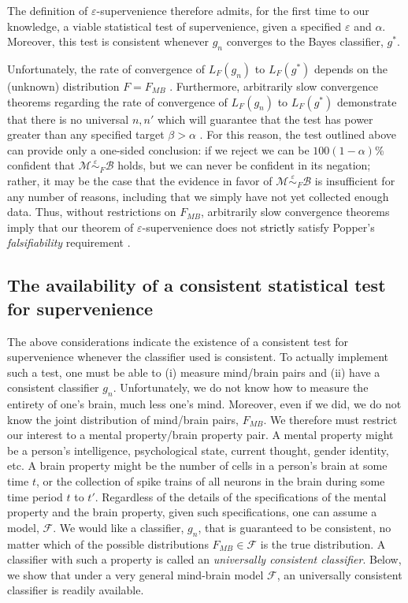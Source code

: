 \documentclass{article}
\newcommand{\conv}{\rightarrow}
\newcommand{\mB}{\mathcal{B}}
\newcommand{\mM}{\mathcal{M}}
\newcommand{\eps}{\varepsilon}
\providecommand{\mc}[1]{\mathcal{#1}}
\newcommand{\hL}{\widehat{L}}
\newcommand{\MeB}{\mM \overset{\varepsilon}{{\sim}}_{F} \mB}
\providecommand{\tr}[1]{\textcolor{black}{#1}}
\begin{document}
The definition of $\eps$-supervenience therefore admits, for the first time to our knowledge, a viable statistical test of supervenience, given a specified $\eps$ and $\alpha$. Moreover, this test is consistent whenever $g_n$ converges to the Bayes classifier, $g^*$.


Unfortunately, the rate of convergence of $L_{F}(g_n)$ to $L_{F}(g^*)$ depends on the (unknown) distribution $F=F_{MB}$ \cite{DGL96}. Furthermore, arbitrarily slow convergence theorems regarding the rate of convergence of $L_{F}(g_n)$ to $L_{F}(g^*)$ demonstrate that there is no universal $n,n'$ which will guarantee that the test has power greater than any specified target $\beta > \alpha$ \cite{Devroye83}. For this reason, the test outlined above can provide only a one-sided conclusion: if we reject we can be $100(1-\alpha)$\% confident that $\MeB$ holds, but we can never be confident in its negation; rather, it may be the case that the evidence in favor of $\MeB$ is insufficient for any number of reasons, including that we simply have not yet collected enough data. Thus, without restrictions on $F_{MB}$, arbitrarily slow convergence theorems imply that our theorem of $\varepsilon$-supervenience does not \tr{strictly} satisfy Popper's {\it falsifiability} requirement \cite{Popper}.



\subsection*{The availability of a consistent statistical test for supervenience} %
\label{sub:uc}

The above considerations indicate the existence of a consistent test for supervenience whenever the classifier used is consistent.  
To actually implement such a test, one must be able to (i) measure mind/brain pairs and (ii) have a consistent classifier $g_n$.  Unfortunately, we do not know how to measure the entirety of one's brain, much less one's mind. Moreover, even if we did, we do not know the joint distribution of mind/brain pairs, $F_{MB}$.  We therefore must restrict our interest to a mental property/brain property pair.  
A mental property might be a person's intelligence, psychological state, current thought, gender identity, etc.  A brain property might be the number of cells in a person's brain at some time $t$, or the collection of spike trains of all neurons in the brain during some time period $t$ to $t'$.  Regardless of the details of the specifications of the mental property and the brain property, given such specifications, one can assume a model, $\mc{F}$.  We would like a classifier, $g_n$, that is guaranteed to be consistent, no matter which of the possible distributions $F_{MB} \in \mc{F}$ is the true distribution.  A classifier with such a property is called an \emph{universally consistent classifier}.  Below, we show that under a very general mind-brain model $\mc{F}$, an universally consistent classifier is readily available.
\end{document}
